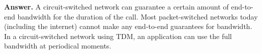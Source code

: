 
\textbf{Answer.} A circuit\hyp{}switched network can guarantee a
certain amount of end\hyp{}to\hyp{}end bandwidth for the duration of
the call. Most packet\hyp{}switched networks today (including the
internet) cannot make any end\hyp{}to\hyp{}end guarantees for
bandwidth. In a circuit\hyp{}switched network using TDM, an
application can use the full bandwidth at periodical moments.
